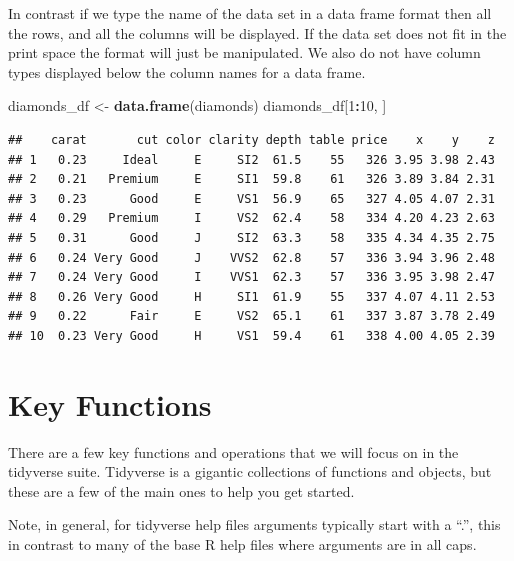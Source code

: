 \documentclass[
]{book}
\newenvironment{Shaded}{\begin{snugshade}}{\end{snugshade}}
\newcommand{\DecValTok}[1]{\textcolor[rgb]{0.00,0.00,0.81}{#1}}
\newcommand{\KeywordTok}[1]{\textcolor[rgb]{0.13,0.29,0.53}{\textbf{#1}}}
\newcommand{\NormalTok}[1]{#1}
\newcommand{\OperatorTok}[1]{\textcolor[rgb]{0.81,0.36,0.00}{\textbf{#1}}}
\newcommand{\StringTok}[1]{\textcolor[rgb]{0.31,0.60,0.02}{#1}}
\begin{document}
In contrast if we type the name of the data set in a data frame format then all the rows, and all the columns will be displayed. If the data set does not fit in the print space the format will just be manipulated. We also do not have column types displayed below the column names for a data frame.

\begin{Shaded}
\begin{Highlighting}[]
\NormalTok{diamonds_df <-}\StringTok{ }\KeywordTok{data.frame}\NormalTok{(diamonds)}
\NormalTok{diamonds_df[}\DecValTok{1}\OperatorTok{:}\DecValTok{10}\NormalTok{, ]}
\end{Highlighting}
\end{Shaded}

\begin{verbatim}
##    carat       cut color clarity depth table price    x    y    z
## 1   0.23     Ideal     E     SI2  61.5    55   326 3.95 3.98 2.43
## 2   0.21   Premium     E     SI1  59.8    61   326 3.89 3.84 2.31
## 3   0.23      Good     E     VS1  56.9    65   327 4.05 4.07 2.31
## 4   0.29   Premium     I     VS2  62.4    58   334 4.20 4.23 2.63
## 5   0.31      Good     J     SI2  63.3    58   335 4.34 4.35 2.75
## 6   0.24 Very Good     J    VVS2  62.8    57   336 3.94 3.96 2.48
## 7   0.24 Very Good     I    VVS1  62.3    57   336 3.95 3.98 2.47
## 8   0.26 Very Good     H     SI1  61.9    55   337 4.07 4.11 2.53
## 9   0.22      Fair     E     VS2  65.1    61   337 3.87 3.78 2.49
## 10  0.23 Very Good     H     VS1  59.4    61   338 4.00 4.05 2.39
\end{verbatim}

\hypertarget{key-functions}{%
\section{Key Functions}\label{key-functions}}

There are a few key functions and operations that we will focus on in the tidyverse suite. Tidyverse is a gigantic collections of functions and objects, but these are a few of the main ones to help you get started.

Note, in general, for tidyverse help files arguments typically start with a ``.'', this in contrast to many of the base R help files where arguments are in all caps.
\end{document}

